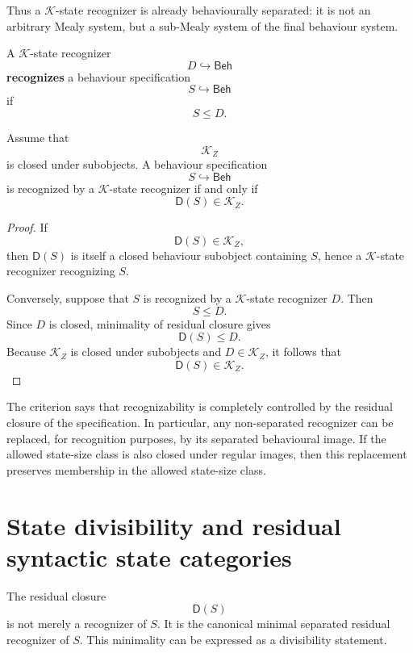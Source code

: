 Thus a \(\mathcal K\)-state recognizer is already behaviourally separated:
it is not an arbitrary Mealy system, but a sub-Mealy system of the final
behaviour system.

\begin{definition}
\label{def:state-eilenberg-recognition-by-state-recognizer}
A \(\mathcal K\)-state recognizer
\[
D\hookrightarrow\mathsf{Beh}
\]
\textbf{recognizes} a behaviour specification
\[
S\hookrightarrow\mathsf{Beh}
\]
if
\[
S\leq D.
\]
\end{definition}

\begin{proposition}
\label{prop:state-eilenberg-state-recognizability-criterion}
Assume that
\[
\mathcal K_Z
\]
is closed under subobjects. A behaviour specification
\[
S\hookrightarrow\mathsf{Beh}
\]
is recognized by a \(\mathcal K\)-state recognizer if and only if
\[
\mathsf D(S)\in\mathcal K_Z.
\]
\end{proposition}

\begin{proof}
If
\[
\mathsf D(S)\in\mathcal K_Z,
\]
then \(\mathsf D(S)\) is itself a closed behaviour subobject containing
\(S\), hence a \(\mathcal K\)-state recognizer recognizing \(S\).

Conversely, suppose that \(S\) is recognized by a \(\mathcal K\)-state
recognizer \(D\). Then
\[
S\leq D.
\]
Since \(D\) is closed, minimality of residual closure gives
\[
\mathsf D(S)\leq D.
\]
Because \(\mathcal K_Z\) is closed under subobjects and \(D\in\mathcal K_Z\),
it follows that
\[
\mathsf D(S)\in\mathcal K_Z.
\]
\end{proof}

The criterion says that recognizability is completely controlled by the
residual closure of the specification. In particular, any non-separated
recognizer can be replaced, for recognition purposes, by its separated
behavioural image. If the allowed state-size class is also closed under
regular images, then this replacement preserves membership in the allowed
state-size class.

\section{State divisibility and residual syntactic state categories}
\label{sec:state-eilenberg-state-divisibility}

The residual closure
\[
\mathsf D(S)
\]
is not merely a recognizer of \(S\). It is the canonical minimal separated
residual recognizer of \(S\). This minimality can be expressed as a
divisibility statement.

